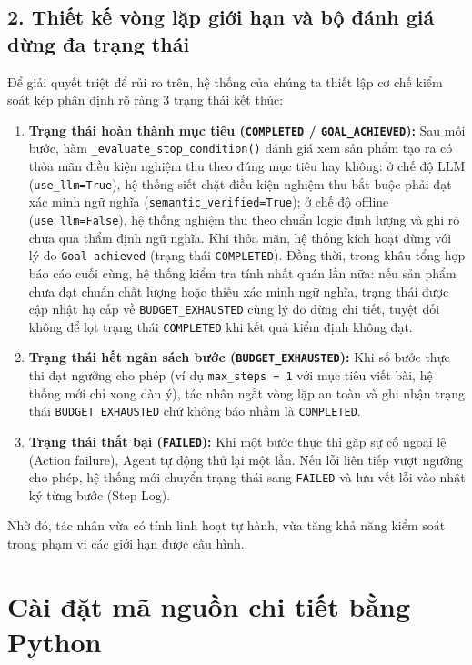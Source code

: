 \documentclass[]{article}
\begin{document}
\subsection{2. Thiết kế vòng lặp giới hạn và bộ đánh giá dừng đa trạng thái}
Để giải quyết triệt để rủi ro trên, hệ thống của chúng ta thiết lập cơ chế kiểm soát kép phân định rõ ràng 3 trạng thái kết thúc:
\begin{enumerate}
    \item \textbf{Trạng thái hoàn thành mục tiêu (\texttt{COMPLETED} / \texttt{GOAL\_ACHIEVED}):} Sau mỗi bước, hàm \texttt{\_evaluate\_stop\_condition()} đánh giá xem sản phẩm tạo ra có thỏa mãn điều kiện nghiệm thu theo đúng mục tiêu hay không: ở chế độ LLM (\texttt{use\_llm=True}), hệ thống siết chặt điều kiện nghiệm thu bắt buộc phải đạt xác minh ngữ nghĩa (\texttt{semantic\_verified=True}); ở chế độ offline (\texttt{use\_llm=False}), hệ thống nghiệm thu theo chuẩn logic định lượng và ghi rõ chưa qua thẩm định ngữ nghĩa. Khi thỏa mãn, hệ thống kích hoạt dừng với lý do \texttt{Goal achieved} (trạng thái \texttt{COMPLETED}). Đồng thời, trong khâu tổng hợp báo cáo cuối cùng, hệ thống kiểm tra tính nhất quán lần nữa: nếu sản phẩm chưa đạt chuẩn chất lượng hoặc thiếu xác minh ngữ nghĩa, trạng thái được cập nhật hạ cấp về \texttt{BUDGET\_EXHAUSTED} cùng lý do dừng chi tiết, tuyệt đối không để lọt trạng thái \texttt{COMPLETED} khi kết quả kiểm định không đạt.
    \item \textbf{Trạng thái hết ngân sách bước (\texttt{BUDGET\_EXHAUSTED}):} Khi số bước thực thi đạt ngưỡng cho phép (ví dụ \texttt{max\_steps = 1} với mục tiêu viết bài, hệ thống mới chỉ xong dàn ý), tác nhân ngắt vòng lặp an toàn và ghi nhận trạng thái \texttt{BUDGET\_EXHAUSTED} chứ không báo nhầm là \texttt{COMPLETED}.
    \item \textbf{Trạng thái thất bại (\texttt{FAILED}):} Khi một bước thực thi gặp sự cố ngoại lệ (Action failure), Agent tự động thử lại một lần. Nếu lỗi liên tiếp vượt ngưỡng cho phép, hệ thống mới chuyển trạng thái sang \texttt{FAILED} và lưu vết lỗi vào nhật ký từng bước (Step Log).
\end{enumerate}

Nhờ đó, tác nhân vừa có tính linh hoạt tự hành, vừa tăng khả năng kiểm soát trong phạm vi các giới hạn được cấu hình.

\section{Cài đặt mã nguồn chi tiết bằng Python}\label{cai-dat-ma-nguon}
\end{document}

